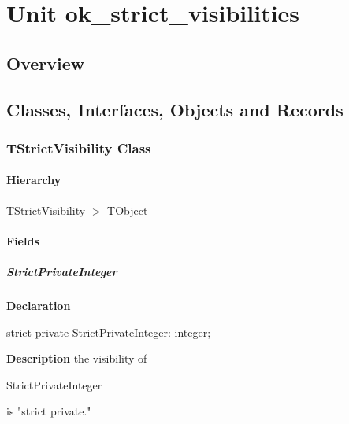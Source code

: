 \documentclass{report}
\begin{document}
\newlength{\tmplength}
\chapter{Unit ok{\_}strict{\_}visibilities}
\section{Overview}
\begin{description}
\item[\texttt{\begin{ttfamily}TStrictVisibility\end{ttfamily} Class}]
\end{description}
\section{Classes, Interfaces, Objects and Records}
\subsection*{TStrictVisibility Class}
\subsubsection*{\large{\textbf{Hierarchy}}\normalsize\hspace{1ex}\hfill}
TStrictVisibility {$>$} TObject
\subsubsection*{\large{\textbf{Fields}}\normalsize\hspace{1ex}\hfill}
\paragraph*{StrictPrivateInteger}\hspace*{\fill}

\begin{list}{}{
\setlength{\itemindent}{0cm}
\setlength{\listparindent}{0cm}
\setlength{\leftmargin}{\evensidemargin}
\addtolength{\leftmargin}{\tmplength}
\settowidth{\labelsep}{X}
\addtolength{\leftmargin}{\labelsep}
\setlength{\labelwidth}{\tmplength}
}
\begin{flushleft}
\item[\textbf{Declaration}\hfill]
\begin{ttfamily}
strict private StrictPrivateInteger: integer;\end{ttfamily}


\end{flushleft}
\par
\item[\textbf{Description}]
the visibility of \begin{ttfamily}StrictPrivateInteger\end{ttfamily} is "strict private."

\end{list}
\end{document}
